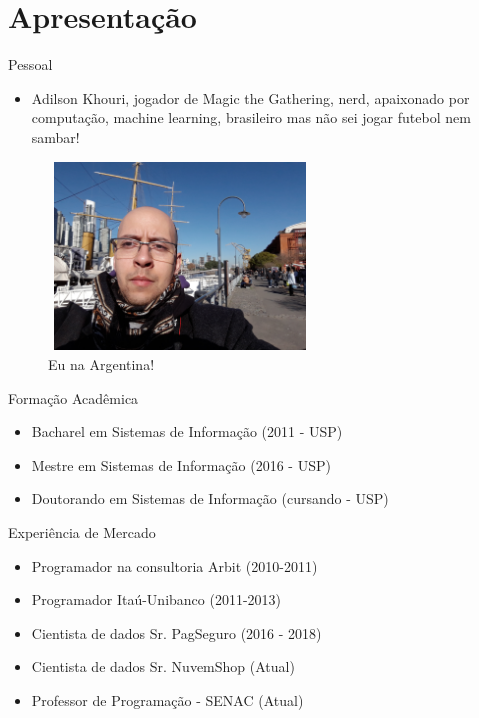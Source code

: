 \section*{Apresentação}

\begin{frame}	
	\begin{block}{Pessoal}	
		\begin{itemize}
			\item Adilson Khouri,  jogador de Magic the Gathering, nerd, apaixonado por computação, machine learning, brasileiro mas não sei jogar futebol nem sambar!
		\end{itemize}
		\begin{figure}[!htb]
			\centering	  				
			\includegraphics[height=5cm, width = 7cm]{./pic/AdilsonArgentina.jpg}
			\caption{Eu na Argentina!}
			\label{fig_adilson_argentina}
		\end{figure}
		
	\end{block}
\end{frame}
			
\begin{frame}	
	\begin{block}{Formação Acadêmica}
		 \begin{itemize}
			  \item Bacharel em Sistemas de Informação (2011 - USP)
			  \item Mestre em Sistemas de Informação (2016 - USP)
			  \item Doutorando em Sistemas de Informação (cursando - USP)
		  \end{itemize}
	\end{block}
\end{frame}

\begin{frame}	
	\begin{block}{Experiência de Mercado}
		\begin{itemize}
			\item Programador na consultoria Arbit (2010-2011)
			\item Programador Itaú-Unibanco (2011-2013)
			\item Cientista de dados Sr. PagSeguro (2016 - 2018)
			\item Cientista de dados Sr. NuvemShop (Atual)
			\item Professor de Programação - SENAC (Atual)
		\end{itemize}
	\end{block}
\end{frame}
